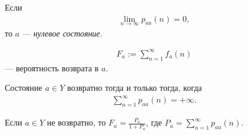\documentclass[../main.tex]{subfiles}
\begin{document}
\begin{df}
 Если
 \begin{align*}
  \lim_{n \to \infty} p_{aa}(n)  = 0,
 \end{align*} то $ a $ --- \textit{нулевое состояние}.
\end{df}

\begin{notatn*}
 \begin{align*}
  F_a := \sum_{n=1}^{\infty} f_a(n)
 \end{align*} --- вероятность возврата в $ a $.
\end{notatn*}

\begin{thm}
 Состояние $ a \in Y $  возвратно тогда и только тогда, когда
 \begin{align*}
  \sum_{n=1}^{\infty} p_{aa}(n) = +\infty.
 \end{align*}

 Если $ a \in Y $  не возвратно, то $ F_a = \frac{P_a}{1 + P_a} $, где $ P_a = \sum_{n=1}^{\infty} p_{aa}(n) $.
\end{thm}
\end{document}
